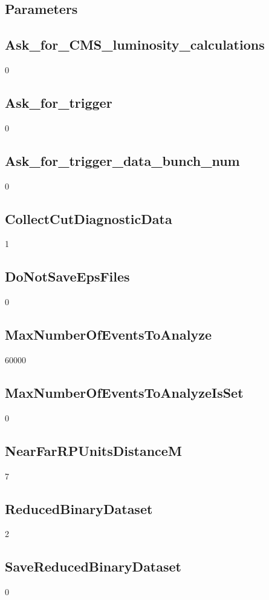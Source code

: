 \documentclass{article}
\begin{document}
\begin{landscape}
\tableofcontents
\newpage
\section{Parameters}
\subsection{Ask\_for\_CMS\_luminosity\_calculations}
0 \newline
\subsection{Ask\_for\_trigger}
0 \newline
\subsection{Ask\_for\_trigger\_data\_bunch\_num}
0 \newline
\subsection{CollectCutDiagnosticData}
1 \newline
\subsection{DoNotSaveEpsFiles}
0 \newline
\subsection{MaxNumberOfEventsToAnalyze}
60000 \newline
\subsection{MaxNumberOfEventsToAnalyzeIsSet}
0 \newline
\subsection{NearFarRPUnitsDistanceM}
7 \newline
\subsection{ReducedBinaryDataset}
2 \newline
\subsection{SaveReducedBinaryDataset}
0 \newline

\end{landscape}
\end{document}
